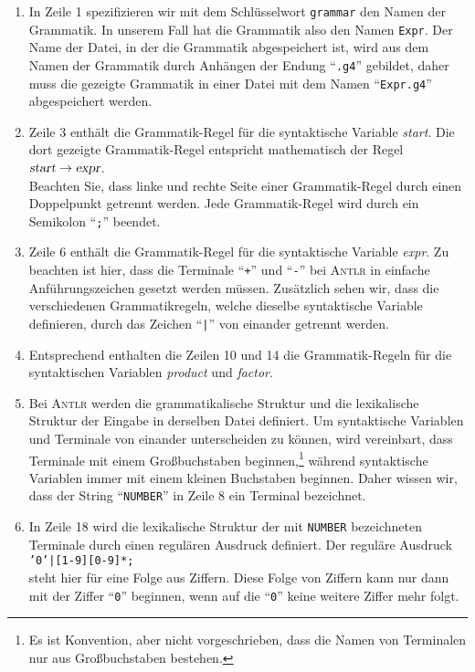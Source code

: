 \begin{enumerate}
\item In Zeile 1 spezifizieren wir mit dem Schl\"usselwort \texttt{grammar} den Namen der Grammatik.
      In unserem Fall hat die Grammatik also den Namen \texttt{Expr}.  Der Name  der Datei, in der
      die Grammatik abgespeichert ist, wird aus dem Namen der Grammatik durch Anh\"angen der Endung ``\texttt{.g4}''
      gebildet, daher muss die gezeigte Grammatik in einer Datei mit dem Namen ``\texttt{Expr.g4}''
      abgespeichert werden.      
\item Zeile 3 enth\"alt die Grammatik-Regel f\"ur die syntaktische Variable
      \textsl{start}.  Die dort gezeigte Grammatik-Regel entspricht mathematisch der Regel
      \\[0.2cm]
      \hspace*{1.3cm}
      $\textsl{start} \rightarrow \textsl{expr}$.
      \\[0.2cm]
      Beachten Sie, dass linke und rechte Seite einer Grammatik-Regel durch einen Doppelpunkt
      getrennt werden.
      Jede Grammatik-Regel wird durch ein Semikolon ``\texttt{;}'' beendet.
\item Zeile 6 enth\"alt die Grammatik-Regel f\"ur die syntaktische Variable
      \textsl{expr}.  Zu beachten ist hier, dass die Terminale ``\texttt{+}'' und
      ``\texttt{-}'' bei \textsc{Antlr} in einfache Anf\"uhrungszeichen gesetzt werden
      m\"ussen.  Zus\"atzlich sehen wir, dass die
      verschiedenen Grammatikregeln, welche dieselbe syntaktische
      Variable definieren, durch das Zeichen ``\texttt{|}'' von einander getrennt werden.
\item Entsprechend enthalten die Zeilen 10 und 14 die Grammatik-Regeln f\"ur die syntaktischen
      Variablen \textsl{product} und \textsl{factor}.  

\item Bei \textsc{Antlr} werden die grammatikalische Struktur und die lexikalische
      Struktur der Eingabe in derselben Datei definiert.  Um syntaktische Variablen und
      Terminale von einander unterscheiden zu k\"onnen, wird vereinbart, dass Terminale mit
      einem Gro{\ss}buchstaben beginnen,\footnote
      {Es ist Konvention, aber nicht vorgeschrieben, dass die 
      Namen von Terminalen nur aus Gro{\ss}buchstaben bestehen.}
      w\"ahrend syntaktische Variablen immer mit einem kleinen
      Buchstaben beginnen.  
      Daher wissen wir, dass der String ``\texttt{NUMBER}'' in Zeile 8
      ein Terminal bezeichnet.
\item In Zeile 18 wird die lexikalische Struktur der mit \texttt{NUMBER} bezeichneten
      Terminale durch einen regul\"aren Ausdruck definiert.  Der regul\"are Ausdruck
      \\[0.2cm]
      \hspace*{1.3cm}
      \texttt{'0'|[1-9][0-9]*;}
      \\[0.2cm]
      steht hier f\"ur eine Folge aus Ziffern.  Diese Folge von Ziffern kann nur dann mit der Ziffer
      ``\texttt{0}'' beginnen, wenn auf die ``\texttt{0}'' keine weitere Ziffer mehr folgt.


\end{enumerate}
